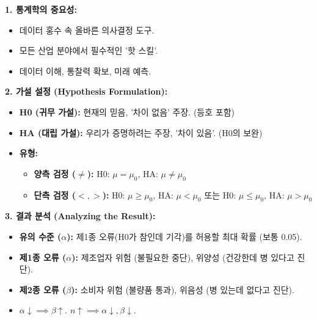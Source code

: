 \documentclass[11pt,a4paper]{article}
\begin{document}
\begin{tcolorbox}[colback=summarycolor, colframe=blue!75!black, title=\textbf{모듈 1 핵심 요약: 가설 검정의 기초}]

\textbf{1. 통계학의 중요성:}
\begin{itemize}
    \item 데이터 홍수 속 올바른 의사결정 도구.
    \item 모든 산업 분야에서 필수적인 '핫 스킬'.
    \item 데이터 이해, 통찰력 확보, 미래 예측.
\end{itemize}

\textbf{2. 가설 설정 (Hypothesis Formulation):}
\begin{itemize}
    \item \textbf{H0 (귀무 가설):} 현재의 믿음, '차이 없음' 주장. (등호 포함)
    \item \textbf{HA (대립 가설):} 우리가 증명하려는 주장, '차이 있음'. (H0의 보완)
    \item \textbf{유형:}
        \begin{itemize}
            \item \textbf{양측 검정 ($\ne$):} H0: $\mu = \mu_0$, HA: $\mu \ne \mu_0$
            \item \textbf{단측 검정 ($<, >$):} H0: $\mu \ge \mu_0$, HA: $\mu < \mu_0$ 또는 H0: $\mu \le \mu_0$, HA: $\mu > \mu_0$
        \end{itemize}
\end{itemize}

\textbf{3. 결과 분석 (Analyzing the Result):}
\begin{itemize}
    \item \textbf{유의 수준 ($\alpha$):} 제1종 오류(H0가 참인데 기각)를 허용할 최대 확률 (보통 0.05).
    \item \textbf{제1종 오류 ($\alpha$):} 제조업자 위험 (불필요한 중단), 위양성 (건강한데 병 있다고 진단).
    \item \textbf{제2종 오류 ($\beta$):} 소비자 위험 (불량품 통과), 위음성 (병 있는데 없다고 진단).
    \item $\alpha \downarrow \implies \beta \uparrow$. $n \uparrow \implies \alpha \downarrow, \beta \downarrow$.
\end{itemize}


\end{tcolorbox}
\end{document}
